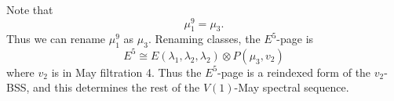 Note that 
\[
\mu_1^9 = \mu_3.
\]
Thus we can rename $\mu_1^9$ as $\mu_3$. Renaming classes, the $E^5$-page is 
\[
E^5\cong E(\lambda_1, \lambda_2, \lambda_2)\otimes P(\mu_3,v_2)
\]
where $v_2$ is in May filtration 4. Thus the $E^5$-page is a reindexed form of the $v_2$-BSS, and this determines the rest of the $V(1)$-May spectral sequence.

\begin{comment}
\subsection{The $H\mathbb{F}_p$-THH-May spectral sequence with coefficients in $\B/p$}
We begin our analysis of the THH-May spectral sequence \eqref{THH-May-BM} for $M=\B/p$. Again, the main point is that we know the abutment of the spectral sequence. 
Recall that the degree of $\lambda_i$ is $2p^i-1$ and the degree of $\mu_3$ is $2p^3$.
\begin{prop}
	We have the following $d_1$-differentials:
	\begin{enumerate}
		\item $d_1\otau_1\dot{=}\, v_1$,
		\item $d_1\mu_1\dot{=}\, \sigma v_1$.
	\end{enumerate}
	Thus the $E^2$-page of the $H\wedge V(0)$-based THH-May spectral sequence is given by 
	\[
	E^2\cong E(\otau_0)\otimes \AE{1}\otimes E(\lambda_1, \mu_1^3\, \sigma v_1)\otimes P(\mu_1^3)\otimes P(v_2)\otimes E(\sigma v_2).
	\].
\end{prop}
\begin{proof}
	The abutment has dimension 1 in degree $2(p-1)$ with generator the class $\bxi_1$. In the input, the element $\bxi_1$ is a permanent cycle for bidegree reasons. Since the element  $v_1$ is  also in degree $2(p-1)$ in the input, it follows that it must be hit by a differential. The only possibility is
\[
d_1(\otau_1) \dot{=} v_1.
\]
In degree $2p$ the input is generated by $\mu_1$ and $\otau_0\lambda_1$, but the abutment is one dimensional in this degree and generated by $\otau_0\lambda_1$. Thus, a differential must kill $\mu_1$. Since $\mu_1$ is in May filtration 0, it must support a differential. The only possibility is 
\[
d_1(\mu_1)\dot{=}\,\sigma v_1.
\]
The multiplicative structure of the THH-May spectral sequence accounts for all other $d_1$-differentials on the $E^1$-page.
\end{proof}


\end{comment}

